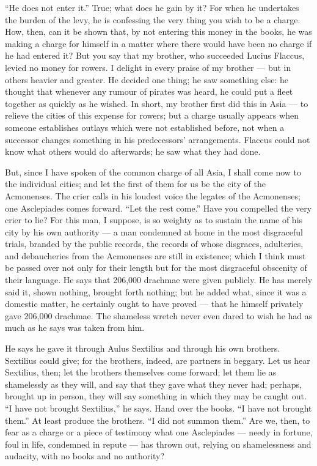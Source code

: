  ``He does not enter it.'' True; what does he gain by it? For when he undertakes the burden of the levy, he is confessing the very thing you wish to be a charge. How, then, can it be shown that, by not entering this money in the books, he was making a charge for himself in a matter where there would have been no charge if he had entered it? But you say that my brother, who succeeded Lucius Flaccus, levied no money for rowers. I delight in every praise of my brother --- but in others heavier and greater. He decided one thing; he saw something else: he thought that whenever any rumour of pirates was heard, he could put a fleet together as quickly as he wished. In short, my brother first did this in Asia --- to relieve the cities of this expense for rowers; but a charge usually appears when someone establishes outlays which were not established before, not when a successor changes something in his predecessors' arrangements. Flaccus could not know what others would do afterwards; he saw what they had done.

 But, since I have spoken of the common charge of all Asia, I shall come now to the individual cities; and let the first of them for us be the city of the Acmonenses. The crier calls in his loudest voice the legates of the Acmonenses; one Asclepiades comes forward. ``Let the rest come.'' Have you compelled the very crier to lie? For this man, I suppose, is so weighty as to sustain the name of his city by his own authority --- a man condemned at home in the most disgraceful trials, branded by the public records, the records of whose disgraces, adulteries, and debaucheries from the Acmonenses are still in existence; which I think must be passed over not only for their length but for the most disgraceful obscenity of their language. He says that 206,000 drachmae were given publicly. He has merely said it, shown nothing, brought forth nothing; but he added what, since it was a domestic matter, he certainly ought to have proved --- that he himself privately gave 206,000 drachmae. The shameless wretch never even dared to wish he had as much as he says was taken from him.

 He says he gave it through Aulus Sextilius and through his own brothers. Sextilius could give; for the brothers, indeed, are partners in beggary. Let us hear Sextilius, then; let the brothers themselves come forward; let them lie as shamelessly as they will, and say that they gave what they never had; perhaps, brought up in person, they will say something in which they may be caught out. ``I have not brought Sextilius,'' he says. Hand over the books. ``I have not brought them.'' At least produce the brothers. ``I did not summon them.'' Are we, then, to fear as a charge or a piece of testimony what one Asclepiades --- needy in fortune, foul in life, condemned in repute --- has thrown out, relying on shamelessness and audacity, with no books and no authority?


